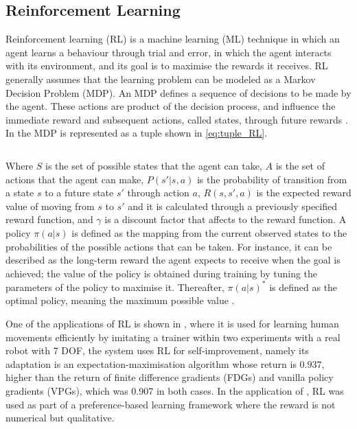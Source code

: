 \documentclass[thesis]{mas_proposal}
\begin{document}
    \subsection{Reinforcement Learning}
    
    Reinforcement learning (RL) is a machine learning (ML) technique in which an agent learns a behaviour through trial and error, in which the agent interacts with its environment, and its goal is to maximise the rewards it receives. RL generally assumes that the learning problem can be modeled as a Markov Decision Problem (MDP). An MDP defines a sequence of decisions to be made by the agent. These actions are product of the decision process, and influence the immediate reward and subsequent actions, called states, through future rewards \cite{Kaelbling1996, Brunke2022, Elguea2023}. In \cite{Elguea2023} the MDP is represented as a tuple shown in \ref{eq:tuple_RL}. 
    
    \begin{equation}
    [S, A, P(s'|s, a), R(s, s', a), \gamma]
    \label{eq:tuple_RL}
    \end{equation}
    
    Where $S$ is the set of possible states that the agent can take, $A$ is the set of actions that the agent can make, $P(s'|s, a)$ is the probability of transition from a state $s$ to a future state $s'$ through action $a$, $R(s, s', a)$ is the expected reward value of moving from $s$ to $s'$ and it is calculated through a previously specified reward function, and $\gamma$ is a discount factor that affects to the reward function. A policy $\pi(a|s)$ is defined as the mapping from the current observed states to the probabilities of the possible actions that can be taken. For instance, it can be described as the long-term reward the agent expects to receive when the goal is achieved; the value of the policy is obtained during training by tuning the parameters of the policy to maximise it. Thereafter, $\pi(a|s)^*$ is defined as the optimal policy, meaning the maximum possible value \cite{Hussein2018, Elguea2023}. 
    
    One of the applications of RL is shown in \cite{Kober2010}, where it is used for learning human movements efficiently by imitating a trainer within two experiments with a real robot with 7 DOF, the system uses RL for self-improvement, namely its adaptation is an expectation-maximisation algorithm whose return is $0.937$, higher than the return of finite difference gradients (FDGs) and vanilla policy gradients (VPGs), which was 0.907 in both cases. In the application of \cite{Fuernkranz2012}, RL was used as part of a preference-based learning framework where the reward is not numerical but qualitative. 
    
\end{document}
